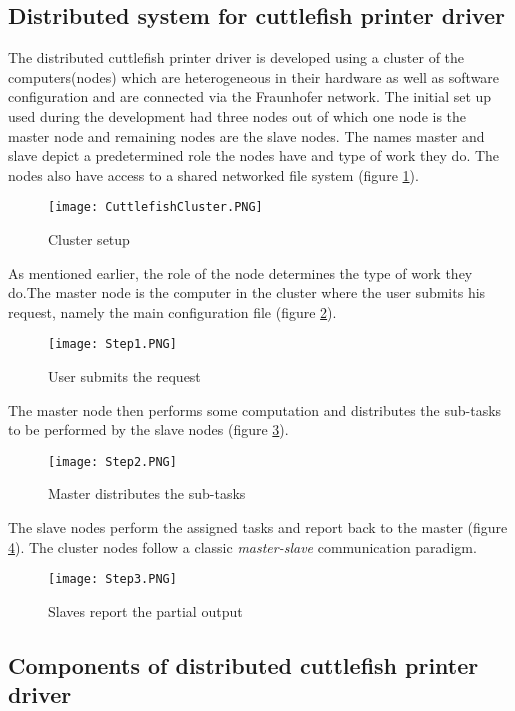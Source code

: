 \subsection{Distributed system for cuttlefish printer driver}

The distributed cuttlefish printer driver is developed using a cluster of the computers(nodes) which are heterogeneous in their hardware as well as software configuration and are connected via the Fraunhofer network. The initial set up used during the development had three nodes out of which one node is the master node and remaining nodes are the slave nodes. The names master and slave depict a predetermined role the nodes have and type of work they do. The nodes also have access to a shared networked file system (figure \ref{fig:CuttlefishCluster}).

\begin{figure}[ht!]
\centering
\texttt{[image: CuttlefishCluster.PNG]}
\caption{Cluster setup}
\label{fig:CuttlefishCluster}
\end{figure}

As mentioned earlier, the role of the node determines the type of work they do.The master node is the computer in the cluster where the user submits his request, namely the main configuration file (figure \ref{fig:Step1}). 

\begin{figure}[ht!]
\centering
\texttt{[image: Step1.PNG]}
\caption{User submits the request}
\label{fig:Step1}
\end{figure}

The master node then performs some computation and distributes the sub-tasks to be performed by the slave nodes (figure \ref{fig:Step2}). 

\begin{figure}[ht!]
\centering
\texttt{[image: Step2.PNG]}
\caption{Master distributes the sub-tasks}
\label{fig:Step2}
\end{figure}

The slave nodes perform the assigned tasks and report back to the master (figure \ref{fig:Step3}). The cluster nodes follow a classic \textit{master-slave} communication paradigm. 

\begin{figure}[ht!]
\centering
\texttt{[image: Step3.PNG]}
\caption{Slaves report the partial output}
\label{fig:Step3}
\end{figure}

\subsection{Components of distributed cuttlefish printer driver}

